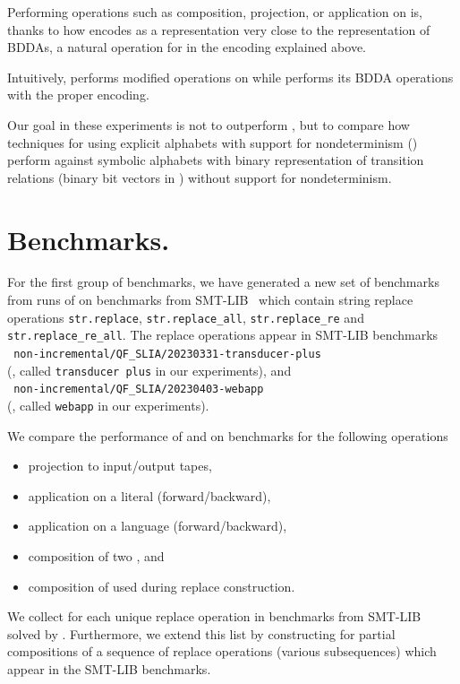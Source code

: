 Performing operations such as composition, projection, or application on \nfts is, thanks to how \mata encodes \nfts as a representation very close to the representation of BDDAs, a natural operation for \mona in the encoding explained above.

Intuitively, \mata performs modified \nfa operations on \nfts while \mona performs its BDDA operations with the proper encoding.

Our goal in these experiments is not to outperform \mona, but to compare how techniques for \nfts using explicit alphabets with support for nondeterminism (\mata) perform against symbolic alphabets with binary representation of transition relations (binary bit vectors in \mona) without support for nondeterminism.

\section{Benchmarks.}

For the first group of benchmarks, we have generated a new set of benchmarks from runs of \noodler on benchmarks from SMT-LIB~\cite{SMTLIB} which contain string replace operations \texttt{str.replace}, \texttt{str.replace\_all}, \texttt{str.replace\_re} and \texttt{str.replace\_re\_all}.
The replace operations appear in SMT-LIB benchmarks
\\\texttt{
non-incremental/QF\_SLIA/20230331-transducer-plus}\\(\transducerPlus, called \texttt{transducer plus} in our experiments), and\\\texttt{
non-incremental/QF\_SLIA/20230403-webapp}\\(\webapp, called \texttt{webapp} in our experiments).

We compare the performance of \mata and \mona on benchmarks for the following operations
\begin{itemize}
  \item projection to input/output tapes,
  \item application on a literal (forward/backward),
  \item application on a language (forward/backward),
  \item composition of two \nfts, and
  \item composition of \nfts used during replace \nft construction.
\end{itemize}

We collect \nfts for each unique replace operation in benchmarks from SMT-LIB solved by \noodler.
Furthermore, we extend this list by constructing \nfts for partial compositions of a sequence of replace operations (various subsequences) which appear in the SMT-LIB benchmarks.

